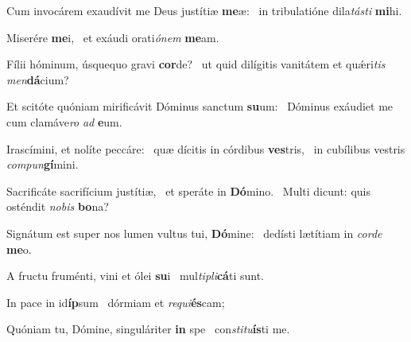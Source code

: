 \item Cum invocárem exaudívit me Deus justítiæ \textbf{me}æ:~\psstar{} in tribulatióne dila\textit{tásti} \textbf{mi}hi.
\item Miserére \textbf{me}i,~\psstar{} et exáudi orati\textit{ónem} \textbf{me}am.
\item Fílii hóminum, úsquequo gravi \textbf{cor}de?~\psstar{} ut quid dilígitis vanitátem et quǽri\textit{tis} \textit{men}\textbf{dá}cium?
\item Et scitóte quóniam mirificávit Dóminus sanctum \textbf{su}um:~\psstar{} Dóminus exáudiet me cum clamáve\textit{ro} \textit{ad} \textbf{e}um.
\item Irascímini, et nolíte peccáre:~\pscross{} quæ dícitis in córdibus \textbf{ves}tris,~\psstar{} in cubílibus vestris \textit{compun}\textbf{gí}mini.
\item Sacrificáte sacrifícium justítiæ,~\pscross{} et speráte in \textbf{Dó}mino.~\psstar{} Multi dicunt: quis osténdit \textit{nobis} \textbf{bo}na?
\item Signátum est super nos lumen vultus tui, \textbf{Dó}mine:~\psstar{} dedísti lætítiam in \textit{corde} \textbf{me}o.
\item A fructu fruménti, vini et ólei \textbf{su}i~\psstar{} mul\textit{tipli}\textbf{cá}ti sunt.
\item In pace in id\textbf{íp}sum~\psstar{} dórmiam et \textit{requi}\textbf{és}cam;
\item Quóniam tu, Dómine, singuláriter \textbf{in} spe~\psstar{} con\textit{stitu}\textbf{ís}ti me.
